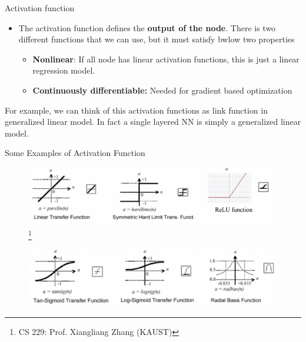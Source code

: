 \documentclass[10pt, hyperref={colorlinks = true,linkcolor = blue}]{beamer}
\begin{document}
{{{\begin{frame}{Activation function}
\begin{itemize}
\item The activation function defines the \textbf{output of the node}.  There is two different functions that we can use, but it must satisfy bwlow two properties
\begin{itemize}
\item \textbf{Nonlinear}: If all node has linear activation functions, this is just a linear regression model.
\item \textbf{Continuously differentiable:} Needed for gradient based optimization
\end{itemize}
\end{itemize}
For example, we can think of this activation functions as link function in generalized linear model. In fact a single layered NN is simply a generalized linear model.  
\end{frame}


\begin{frame}{Some Examples of Activation Function }
\begin{figure}
\includegraphics[width=1\linewidth]{figures/activation-functions1.pdf}\footnote{CS 229: Prof. Xiangliang Zhang (KAUST)}
\end{figure}
\begin{figure}
\includegraphics[width=1\linewidth]{figures/activation-functions2.pdf}
\end{figure}
\end{frame}

}}}
\end{document}
